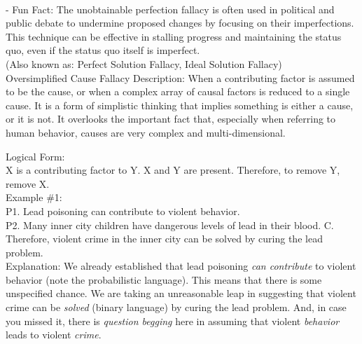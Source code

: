 \documentclass[a4paper,12pt,single,pdftex]{scrartcl}
\begin{document}
    
      
    \\

    
      - Fun Fact: The unobtainable perfection fallacy is often used in political and public debate to undermine proposed changes by focusing on their imperfections. This technique can be effective in stalling progress and maintaining the status quo, even if the status quo itself is imperfect.
    \\

  
    
      (Also known as: Perfect Solution Fallacy, Ideal Solution Fallacy)
    \\

  

Oversimplified Cause Fallacy
    Description: When a contributing factor is assumed to be the cause, or when a complex array of causal factors is reduced to a single cause. It is a form of simplistic thinking that implies something is either a cause, or it is not. It overlooks the important fact that, especially when referring to human behavior, causes are very complex and multi-dimensional.

    
      Logical Form:
    \\

    
      X is a contributing factor to Y. \newline
X and Y are present. \newline
Therefore, to remove Y, remove X.
    \\

    
      Example \#1:
    \\

    
      P1. Lead poisoning can contribute to violent behavior.
    \\

    
      P2. Many inner city children have dangerous levels of lead in their blood. \newline
C. Therefore, violent crime in the inner city can be solved  by curing the lead problem.
    \\

    
      Explanation: We already established that lead poisoning {\it can contribute} to violent behavior (note the probabilistic language). This means that there is some unspecified chance. We are taking an unreasonable leap in suggesting that violent crime can be {\it solved}  (binary language) by curing the lead problem. And, in case you missed it, there is {\it question begging} here in assuming that violent {\it behavior} leads to violent {\it crime}.
    \\
\end{document}

